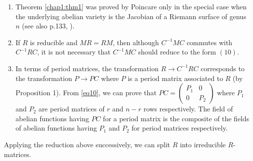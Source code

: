 \begin{remarks*}
\begin{enumerate}
\renewcommand{\labelenumi}{(\theenumi)}
\item Theorem \ref{chap1:thm1} was proved by Poincare only in the special case when
  the underlying abelian variety is the Jacobian of a Riemann surface
  of genus $n$ (see also p.133, \cite{26}).

\item If $R$ is reducible and $MR=RM$, then although $C^{-1}MC$
  commutes with $C^{-1}RC$, it is not necessary that $C^{-1}MC$ should
  reduce to the form $(10)$.

\item In terms of period matrices, the transformation $R\rightarrow
  C^{-1} RC$ corresponds to the transformation $P\rightarrow PC$ where
  $P$ is a period matrix associated to $R$ (by Proposition 1). From
  \eqref{eq10}, we can prove that $PC= \left(\begin{smallmatrix} P_1 & 0
    \\ 0 & P_2 \end{smallmatrix} \right)$ where $P_1$ and $P_2$ are
  period matrices of $r$ and $n-r$ rows respectively. The field of
  abelian functions having $PC$ for a period matrix is the composite
  of the fields of abelian functions having $P_1$ and $P_2$ for period
  matrices respectively.
\end{enumerate}

Applying the reduction above successively, we can split $R$ into
irreducible $R$-matrices.


\end{remarks*}
